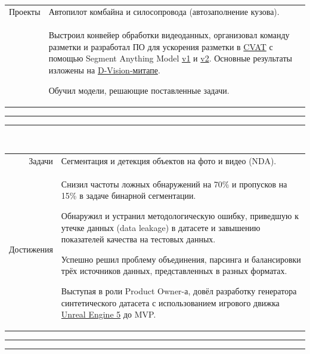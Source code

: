 \documentclass[11pt]{article}
\begin{document}
		\\
		\begin{tabular} {r|p{}}
			Проекты & Автопилот комбайна и силосопровода (автозаполнение кузова).\\
			\noindent{Достижения} & 
			\begin{tabitemize}
			\item Выстроил конвейер обработки видеоданных, организовал команду разметки и разработал ПО для ускорения разметки в \href{https://www.cvat.ai/}{CVAT} с помощью Segment Anything Model \href{https://segment-anything.com/}{v1} и \href{https://sam2.metademolab.com/demo}{v2}. Основные результаты изложены на \href{https://rutube.ru/video/4033ea0473199564892cc5a2f14dcfe6/}{D-Vision-митапе}.
			\item Обучил модели, решающие поставленные задачи.
			\end{tabitemize}
		\end{tabular}%
		\vspace{0.3em}\hrule\vspace{0.1em}\hrule\vspace{0.5em}
		
		\\
		\begin{tabular} {r | p{}}
			Задачи & Сегментация и детекция объектов на фото и видео (NDA).\\
			Достижения &
			\begin{tabitemize}
				\item Снизил частоты ложных обнаружений на 70\% и пропусков на 15\% в задаче бинарной сегментации.
				\item Обнаружил и устранил методологическую ошибку, приведшую к утечке данных (data leakage) в датасете и завышению показателей качества на тестовых данных.
				\item Успешно решил проблему объединения, парсинга и балансировки трёх источников данных, представленных в разных форматах.
				\item Выступая в роли Product Owner-а, довёл разработку генератора синтетического датасета с использованием игрового движка \href{https://www.unrealengine.com/en-US/unreal-engine-5}{Unreal Engine 5} до MVP.
			\end{tabitemize}
		\end{tabular}%
		\vspace{0.3em}\hrule\vspace{0.1em}\hrule\vspace{0.5em}
		
\end{document}
